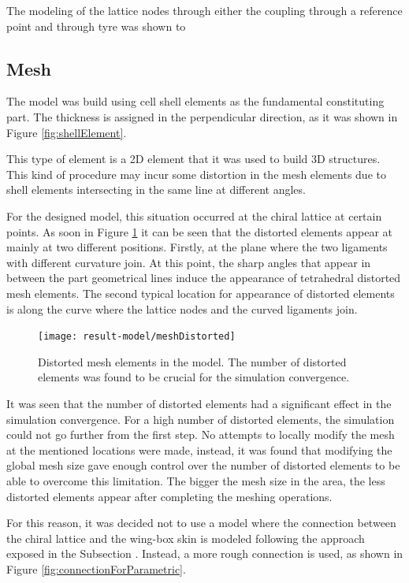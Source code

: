     The modeling of the lattice nodes through either the coupling through a reference point and through tyre was shown to 

  \subsection{Mesh} \label{subsec:mesh_results_model}

    The model was build using cell shell elements as the fundamental constituting part. The thickness is assigned in the perpendicular direction, as it was shown in Figure \ref{fig:shellElement}.

    This type of element is a 2D element that it was used to build 3D structures. This kind of procedure may incur some distortion in the mesh elements due to shell elements intersecting in the same line at different angles. 

    For the designed model, this situation occurred at the chiral lattice at certain points. As soon in Figure \ref{fig:meshDistorted} it can be seen that the distorted elements appear at mainly at two different positions. Firstly, at the plane where the two ligaments with different curvature join. At this point, the sharp angles that appear in between the part geometrical lines induce the appearance of tetrahedral distorted mesh elements. The second typical location for appearance of distorted elements is along the curve where the lattice nodes and the curved ligaments join.

    \begin{figure}[!htpb]
      \centering
      \texttt{[image: result-model/meshDistorted]}
      \caption[Distorted mesh elements in the model]{Distorted mesh elements in the model. The number of distorted elements was found to be crucial for the simulation convergence.}\label{fig:meshDistorted}
    \end{figure}

    It was seen that the number of distorted elements had a significant effect in the simulation convergence. For a high number of distorted elements, the simulation could not go further from the first step. No attempts to locally modify the mesh at the mentioned locations were made, instead, it was found that modifying the global mesh size gave enough control over the number of distorted elements to be able to overcome this limitation. The bigger the mesh size in the area, the less distorted elements appear after completing the meshing operations.

    For this reason, it was decided not to use a model where the connection between the chiral lattice and the wing-box skin is modeled following the approach exposed in the Subsection \label{subsec:connections_computationalModel}. Instead, a more rough connection is used, as shown in Figure \ref{fig:connectionForParametric}.

